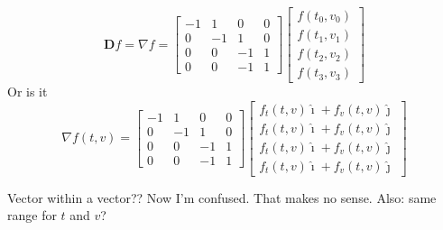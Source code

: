 \documentclass{article}
\begin{document}
$$
\mathbf{D}f = \nabla f = \begin{bmatrix}
	-1 &  1 &  0 & 0 \\
	 0 & -1 &  1 & 0 \\
	 0 &  0 & -1 & 1 \\
	 0 &  0 & -1 & 1
\end{bmatrix}
\begin{bmatrix}
	f(t_0, v_0) \\
	f(t_1, v_1) \\
	f(t_2, v_2) \\
	f(t_3, v_3)
\end{bmatrix}
$$
Or is it
$$
\nabla f(t, v) = \begin{bmatrix}
	-1 &  1 &  0 & 0 \\
	 0 & -1 &  1 & 0 \\
	 0 &  0 & -1 & 1 \\
	 0 &  0 & -1 & 1
\end{bmatrix}
\begin{bmatrix}
	f_t(t, v)\hat \imath + f_v(t, v)\hat \jmath \\
	f_t(t, v)\hat \imath + f_v(t, v)\hat \jmath \\
	f_t(t, v)\hat \imath + f_v(t, v)\hat \jmath \\
	f_t(t, v)\hat \imath + f_v(t, v)\hat \jmath
\end{bmatrix}
$$

Vector within a vector??
Now I'm confused. That makes no sense. 
Also: same range for $t$ and $v$?
\end{document}
